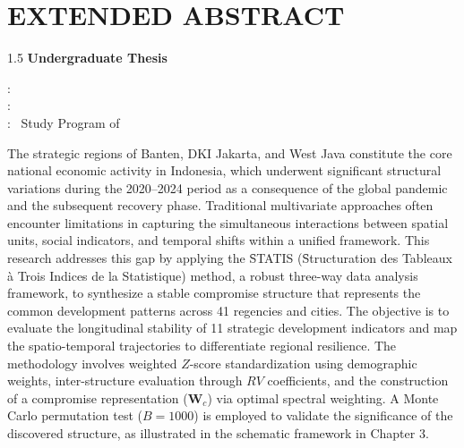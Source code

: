 %
%

\renewcommand{\figurename}{\normalsize Figure}
\renewcommand{\tablename}{\normalsize Table}

\chapter*{\fontsize{14pt}{16pt}\selectfont \textbf{EXTENDED ABSTRACT}}
\begin{singlespace}
\vspace{-0.5cm}
\begin{center}
	\begin{spacing}{1.5}
	{\fontsize{14pt}{16pt}\selectfont \textbf{Undergraduate Thesis}}\\ [0.3cm]
	{\fontsize{14pt}{16pt}\selectfont \textbf{\judulInggris}}\end{spacing}
\end{center}
\vspace{-1.2cm}
\begin{center}
	 : \penulis \\ 
	 : {\npm}\\
	 : \jenjanginggris~Study Program of~\bidanginggris
\end{center}

\vspace*{0.6cm}

The strategic regions of Banten, DKI Jakarta, and West Java constitute the core national economic activity in Indonesia, which underwent significant structural variations during the 2020--2024 period as a consequence of the global pandemic and the subsequent recovery phase. Traditional multivariate approaches often encounter limitations in capturing the simultaneous interactions between spatial units, social indicators, and temporal shifts within a unified framework. This research addresses this gap by applying the \f{STATIS} (\f{Structuration des Tableaux à Trois Indices de la Statistique}) method, a robust three-way data analysis framework, to synthesize a stable compromise structure that represents the common development patterns across 41 regencies and cities. The objective is to evaluate the longitudinal stability of 11 strategic development indicators and map the spatio-temporal trajectories to differentiate regional resilience. The methodology involves weighted $Z$-score standardization using demographic weights, inter-structure evaluation through $RV$ coefficients, and the construction of a compromise representation ($\mathbf{W}_c$) via optimal spectral weighting. A Monte Carlo permutation test ($B=1000$) is employed to validate the significance of the discovered structure, as illustrated in the schematic framework in Chapter 3.


\end{singlespace}
